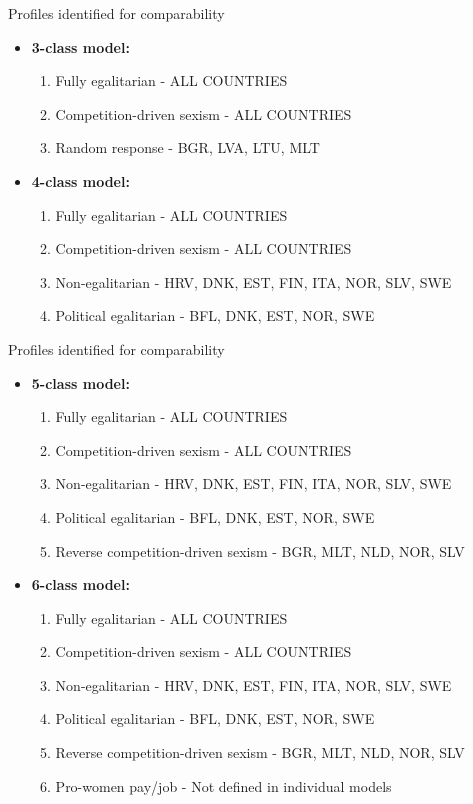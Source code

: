 \documentclass[11pt,t]{beamer}
\begin{document}
\begin{frame}{Profiles identified for comparability}
\begin{itemize}
\item \textbf{3-class model:} 
\begin{enumerate}
	\item Fully egalitarian - ALL COUNTRIES
	\item Competition-driven sexism - ALL COUNTRIES
	\item Random response - BGR, LVA, LTU, MLT
\end{enumerate}
\vspace{3.1mm} 
\item \textbf{4-class model:}  
\begin{enumerate}
	\item Fully egalitarian - ALL COUNTRIES
	\item Competition-driven sexism - ALL COUNTRIES
	\item Non-egalitarian - HRV, DNK, EST, FIN, ITA, NOR, SLV, SWE
	\item Political egalitarian - BFL, DNK, EST, NOR, SWE
\end{enumerate}
\end{itemize}
\end{frame} 

\begin{frame}[c,plain]{Profiles identified for comparability}
\begin{itemize}

\item \textbf{5-class model:}  

\begin{enumerate}
	\item Fully egalitarian - ALL COUNTRIES
	\item Competition-driven sexism - ALL COUNTRIES
	\item Non-egalitarian - HRV, DNK, EST, FIN, ITA, NOR, SLV, SWE
	\item Political egalitarian - BFL, DNK, EST, NOR, SWE
	\item Reverse competition-driven sexism - BGR,  MLT, NLD, NOR, SLV
\end{enumerate}

\vspace{3.1mm} 
\item \textbf{6-class model:}  

\begin{enumerate}
	\item Fully egalitarian - ALL COUNTRIES
	\item Competition-driven sexism - ALL COUNTRIES
	\item Non-egalitarian - HRV, DNK, EST, FIN, ITA, NOR, SLV, SWE
	\item Political egalitarian - BFL, DNK, EST, NOR, SWE
	\item Reverse competition-driven sexism - BGR,  MLT, NLD, NOR, SLV
	\item Pro-women pay/job - Not defined in individual models
\end{enumerate}

\end{itemize}
\end{frame} 
\end{document}
